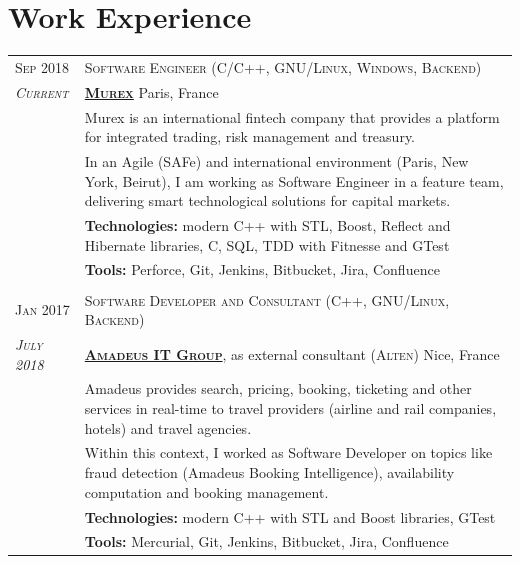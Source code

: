 \documentclass[a4paper,10pt]{article}
\begin{document}
	\vspace{-5mm}

	\section{Work Experience}
	\begin{tabular}{p{1.7cm}|p{15.5cm}}
		\centering\textsc{Sep 2018} &
		\textsc{Software Engineer (C/C++, GNU/Linux, Windows, Backend)} \\
		\centering\emph{\textsc{Current}} &
		\textsc{\textbf{\href{https://www.murex.com/}{Murex}}}  \hfill Paris, France\\
		& Murex is an international fintech company that provides a platform for integrated trading, risk management and treasury.\\
		& In an Agile (SAFe) and international environment (Paris, New York, Beirut), I am working as Software Engineer in a feature team, delivering smart technological solutions for capital markets.\\
		& \textbf{Technologies:} modern C++ with STL, Boost, Reflect and Hibernate libraries, C, SQL, TDD with Fitnesse and GTest\\
		& \textbf{Tools:} Perforce, Git, Jenkins, Bitbucket, Jira, Confluence\\
		
		\multicolumn{2}{c}{} \\
		\centering\textsc{Jan 2017} &
		\textsc{Software Developer and Consultant (C++, GNU/Linux, Backend)} \\
		\centering\emph{\textsc{July 2018}} &
		\textsc{\textbf{\href{http://www.amadeus.com/}{Amadeus IT Group}}}, as external consultant (\textsc{Alten}) \hfill Nice, France\\
		& Amadeus provides search, pricing, booking, ticketing and other services in real-time to travel providers (airline and rail companies, hotels) and travel agencies.\\
		& Within this context, I worked as Software Developer on topics like fraud detection (Amadeus Booking Intelligence), availability computation and booking management.\\		
		& \textbf{Technologies:} modern C++ with STL and Boost libraries, GTest\\
		& \textbf{Tools:} Mercurial, Git, Jenkins, Bitbucket, Jira, Confluence\\


\end{tabular}
\end{document}
